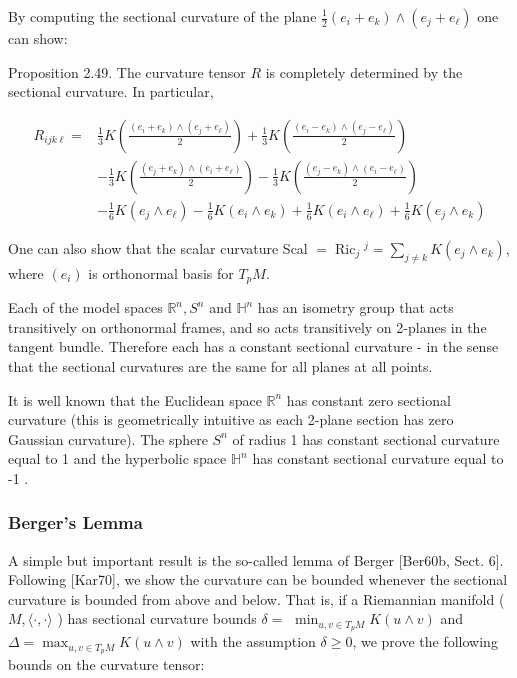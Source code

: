 \documentclass[10pt, letterpaper]{article}
\begin{document}
By computing the sectional curvature of the plane $\frac{1}{2}\left(e_{i}+e_{k}\right) \wedge\left(e_{j}+e_{\ell}\right)$ one can show:

Proposition 2.49. The curvature tensor $R$ is completely determined by the sectional curvature. In particular,

$$
\begin{aligned}
R_{i j k \ell}= & \frac{1}{3} K\left(\frac{\left(e_{i}+e_{k}\right) \wedge\left(e_{j}+e_{\ell}\right)}{2}\right)+\frac{1}{3} K\left(\frac{\left(e_{i}-e_{k}\right) \wedge\left(e_{j}-e_{\ell}\right)}{2}\right) \\
& -\frac{1}{3} K\left(\frac{\left(e_{j}+e_{k}\right) \wedge\left(e_{i}+e_{\ell}\right)}{2}\right)-\frac{1}{3} K\left(\frac{\left(e_{j}-e_{k}\right) \wedge\left(e_{i}-e_{\ell}\right)}{2}\right) \\
& -\frac{1}{6} K\left(e_{j} \wedge e_{\ell}\right)-\frac{1}{6} K\left(e_{i} \wedge e_{k}\right)+\frac{1}{6} K\left(e_{i} \wedge e_{\ell}\right)+\frac{1}{6} K\left(e_{j} \wedge e_{k}\right)
\end{aligned}
$$

One can also show that the scalar curvature Scal $=\operatorname{Ric}_{j}{ }^{j}=\sum_{j \neq k} K\left(e_{j} \wedge e_{k}\right)$, where $\left(e_{i}\right)$ is orthonormal basis for $T_{p} M$.

Each of the model spaces $\mathbb{R}^{n}, S^{n}$ and $\mathbb{H}^{n}$ has an isometry group that acts transitively on orthonormal frames, and so acts transitively on 2-planes in the tangent bundle. Therefore each has a constant sectional curvature - in the sense that the sectional curvatures are the same for all planes at all points.

It is well known that the Euclidean space $\mathbb{R}^{n}$ has constant zero sectional curvature (this is geometrically intuitive as each 2-plane section has zero Gaussian curvature). The sphere $S^{n}$ of radius 1 has constant sectional curvature equal to 1 and the hyperbolic space $\mathbb{H}^{n}$ has constant sectional curvature equal to -1 .

\subsubsection*{Berger's Lemma}
A simple but important result is the so-called lemma of Berger [Ber60b, Sect. 6]. Following [Kar70], we show the curvature can be bounded whenever the sectional curvature is bounded from above and below. That is, if a Riemannian manifold ( $M,\langle\cdot, \cdot\rangle$ ) has sectional curvature bounds $\delta=$ $\min _{u, v \in T_{p} M} K(u \wedge v)$ and $\Delta=\max _{u, v \in T_{p} M} K(u \wedge v)$ with the assumption $\delta \geq 0$, we prove the following bounds on the curvature tensor:
\end{document}

